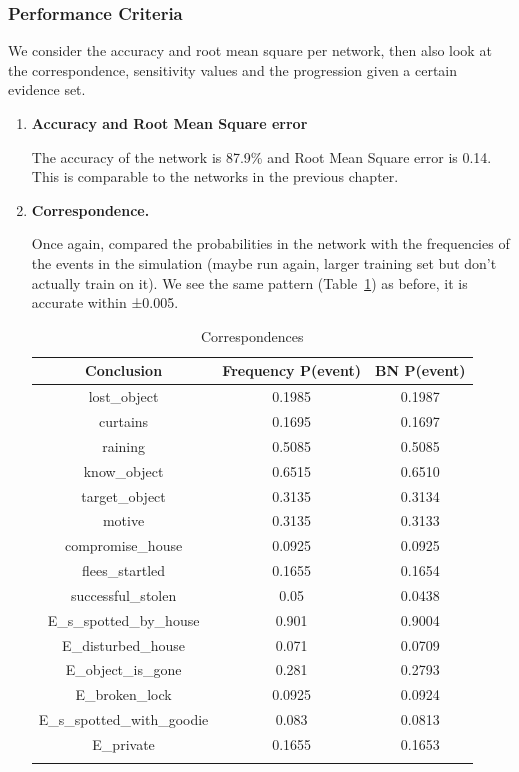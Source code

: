 \subsubsection{Performance Criteria}
We consider the accuracy and root mean square per network, then also look at the correspondence, sensitivity values and the progression given a certain evidence set.
\begin{enumerate}
\item \textbf{Accuracy and Root Mean Square error}

The accuracy of the network is 87.9\% and Root Mean Square error is 0.14. This is comparable to the networks in the previous chapter.

\item \textbf{Correspondence.}

Once again, compared the probabilities in the network with the frequencies of the events in the simulation (maybe run again, larger training set but don't actually train on it). We see the same pattern (Table~\ref{test}) as before, it is accurate within ±0.005. 

\begin{table}
\centering
\begin{tabular}{|c|c|c|}
 \hline
 Conclusion & Frequency P(event) & BN P(event)\\
 \hline
lost\_object   & 0.1985 & 0.1987\\
curtains & 0.1695 &  0.1697\\
raining & 0.5085 &  0.5085\\
know\_object & 0.6515 &  0.6510\\
target\_object & 0.3135 & 0.3134\\
motive & 0.3135 & 0.3133\\
compromise\_house & 0.0925 & 0.0925 \\
flees\_startled & 0.1655 &  0.1654\\
successful\_stolen & 0.05 & 0.0438\\ 
E\_s\_spotted\_by\_house&  0.901 & 0.9004 \\ 
E\_disturbed\_house& 0.071 &  0.0709\\ 
E\_object\_is\_gone&  0.281 &  0.2793\\ 
E\_broken\_lock&  0.0925 &  0.0924\\ 
E\_s\_spotted\_with\_goodie& 0.083  & 0.0813 \\ 
E\_private&  0.1655 & 0.1653\\ 
\hline
\label{test}
\end{tabular}
\caption{Correspondences}
\end{table}



\end{enumerate}
